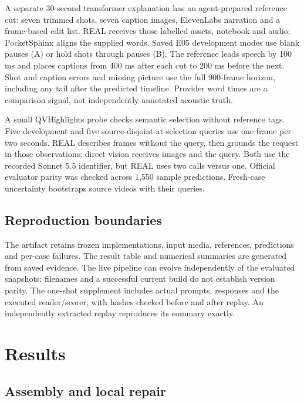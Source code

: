 \documentclass{ceurart}
\begin{document}
A separate 30-second transformer explanation has an agent-prepared
reference cut: seven trimmed shots, seven caption images, ElevenLabs
narration and a frame-based edit list. REAL receives those labelled
assets, notebook and audio; PocketSphinx aligns the supplied words.
Saved E05 development modes use blank pauses (A) or hold shots through
pauses (B). The reference leads speech by 100 ms and places captions
from 400 ms after each cut to 200 ms before the next. Shot and caption
errors and missing picture use the full 900-frame horizon, including any
tail after the predicted timeline. Provider word times are a comparison
signal, not independently annotated acoustic truth.

A small QVHighlights probe \citep{lei2021qvhighlights} checks semantic
selection without reference tags. Five development and five
source-disjoint-at-selection queries use one frame per two seconds. REAL
describes frames without the query, then grounds the request in those
observations; direct vision receives images and the query. Both use the
recorded Sonnet 5.5 identifier, but REAL uses two calls versus one.
Official evaluator parity was checked across 1,550 sample predictions.
Fresh-case uncertainty bootstraps source videos with their queries.

\subsection{Reproduction boundaries}\label{reproduction-boundaries}

The artifact retains frozen implementations, input media, references,
predictions and per-case failures. The result table and numerical
summaries are generated from saved evidence. The live pipeline can
evolve independently of the evaluated snapshots; filenames and a
successful current build do not establish version parity. The one-shot
supplement includes actual prompts, responses and the executed
reader/scorer, with hashes checked before and after replay. An
independently extracted replay reproduces its summary exactly.

\section{Results}\label{results}

\subsection{Assembly and local repair}\label{assembly-and-local-repair}
\end{document}
